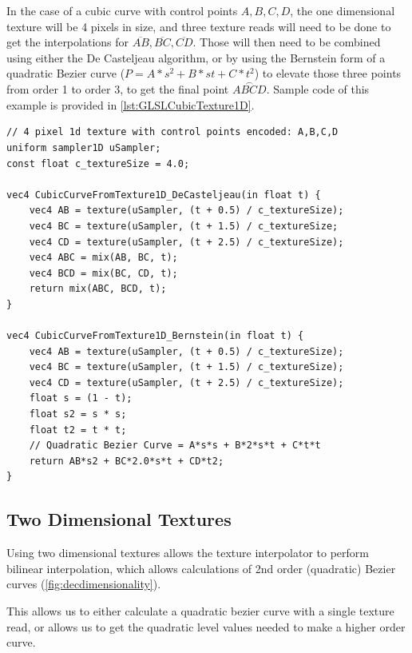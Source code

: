 \documentclass{jcgt}
\begin{document}
In the case of a cubic curve with control points $A,B,C,D$, the one dimensional texture will be 4 pixels in size, and three texture reads will need to be done to get the interpolations for $\overline{AB},\overline{BC},\overline{CD}$.  Those will then need to be combined using either the De Casteljeau algorithm, or by using the Bernstein form of a quadratic Bezier curve ($P = A*s^2 + B*st + C*t^2$) to elevate those three points from order 1 to order 3, to get the final point $\stackrel{\frown}{ABCD}$.  Sample code of this example is provided in \autoref{lst:GLSLCubicTexture1D}.

\begin{lstlisting}[caption={GLSL for evaluating a cubic curve encoded in a 4 pixel 1d texture.  Linear texture sampling is used to evaluate the linear level of the De Casteljeau algorithm, then the process is continued both with the De Casteljeau algorithm, as well as the Bernstein form of a quadratic Bezier curve.}, label={lst:GLSLCubicTexture1D}]
// 4 pixel 1d texture with control points encoded: A,B,C,D
uniform sampler1D uSampler; 
const float c_textureSize = 4.0;

vec4 CubicCurveFromTexture1D_DeCasteljeau(in float t) {
    vec4 AB = texture(uSampler, (t + 0.5) / c_textureSize);
    vec4 BC = texture(uSampler, (t + 1.5) / c_textureSize;
    vec4 CD = texture(uSampler, (t + 2.5) / c_textureSize);
    vec4 ABC = mix(AB, BC, t);
    vec4 BCD = mix(BC, CD, t);
    return mix(ABC, BCD, t);
}

vec4 CubicCurveFromTexture1D_Bernstein(in float t) {
    vec4 AB = texture(uSampler, (t + 0.5) / c_textureSize);
    vec4 BC = texture(uSampler, (t + 1.5) / c_textureSize);
    vec4 CD = texture(uSampler, (t + 2.5) / c_textureSize);
    float s = (1 - t);
    float s2 = s * s;
    float t2 = t * t;
    // Quadratic Bezier Curve = A*s*s + B*2*s*t + C*t*t
    return AB*s2 + BC*2.0*s*t + CD*t2;
}
\end{lstlisting}

\subsection{Two Dimensional Textures}
Using two dimensional textures allows the texture interpolator to perform bilinear interpolation, which allows calculations of 2nd order (quadratic) Bezier curves (\autoref{fig:decdimensionality}).

This allows us to either calculate a quadratic bezier curve with a single texture read, or allows us to get the quadratic level values needed to make a higher order curve.
\end{document}
